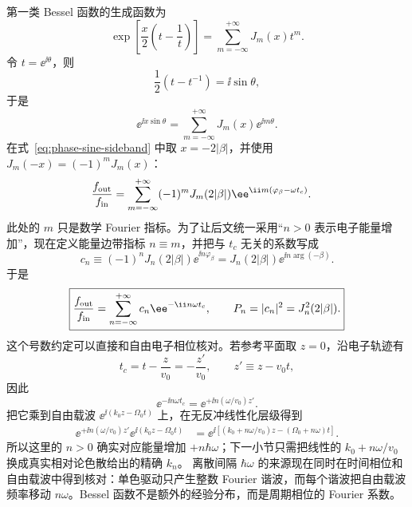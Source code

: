 第一类 Bessel 函数的生成函数为
\begin{equation}
\exp\!\left[\frac{x}{2}\left(t-\frac1t\right)\right]
=\sum_{m=-\infty}^{+\infty}J_m(x)t^m.
\label{eq:bessel-generating-function}
\end{equation}
令 $t=\ee^{\ii\theta}$，则
\begin{equation}
\frac12\left(t-t^{-1}\right)
=\ii\sin\theta,
\end{equation}
于是
\begin{equation}
\boxed{
\ee^{\ii x\sin\theta}
=\sum_{m=-\infty}^{+\infty}J_m(x)\ee^{\ii m\theta}.}
\label{eq:JA}
\end{equation}
在式~\eqref{eq:phase-sine-sideband} 中取 $x=-2|\beta|$，并使用
$J_m(-x)=(-1)^mJ_m(x)$：
\begin{align}
\frac{f_{\rm out}}{f_{\rm in}}
&=\sum_{m=-\infty}^{+\infty}
(-1)^mJ_m(2|\beta|)
\ee^{\ii m(\varphi_\beta-\omega t_c)}.
\label{eq:phase-fourier-raw-index}
\end{align}
此处的 $m$ 只是数学 Fourier 指标。为了让后文统一采用“$n>0$ 表示电子能量增加”，现在定义能量边带指标 $n\equiv m$，并把与 $t_c$ 无关的系数写成
\begin{equation}
\boxed{
 c_n
 \equiv (-1)^nJ_n(2|\beta|)\ee^{\ii n\varphi_\beta}
 =J_n(2|\beta|)\ee^{\ii n\arg(-\beta)}.}
\label{eq:sideband-amplitude-gain-convention}
\end{equation}
于是
\begin{equation}
\boxed{
\frac{f_{\rm out}}{f_{\rm in}}
=\sum_{n=-\infty}^{+\infty}c_n\ee^{-\ii n\omega t_c},
\qquad
P_n=|c_n|^2=J_n^2(2|\beta|).}
\label{eq:Pn-beta-standard}
\end{equation}
这个号数约定可以直接和自由电子相位核对。若参考平面取 $z=0$，沿电子轨迹有
\begin{equation}
 t_c=t-\frac{z}{v_0}=-\frac{z'}{v_0},
 \qquad z'\equiv z-v_0t,
\end{equation}
因此
\begin{equation}
 \ee^{-\ii n\omega t_c}
 =\ee^{+\ii n(\omega/v_0)z'}.
\label{eq:tc-to-comoving-sideband-phase}
\end{equation}
把它乘到自由载波
$\ee^{\ii(k_0z-\Omega_0t)}$ 上，在无反冲线性化层级得到
\begin{align}
\ee^{+\ii n(\omega/v_0)z'}
\ee^{\ii(k_0z-\Omega_0t)}
&=\ee^{\ii[(k_0+n\omega/v_0)z-(\Omega_0+n\omega)t]}.
\label{eq:gain-index-carrier-check}
\end{align}
所以这里的 $n>0$ 确实对应能量增加 $+n\hbar\omega$；下一小节只需把线性的
$k_0+n\omega/v_0$ 换成真实相对论色散给出的精确 $k_n$。
离散间隔 $\hbar\omega$ 的来源现在同时在时间相位和自由载波中得到核对：单色驱动只产生整数 Fourier 谐波，而每个谐波把自由载波频率移动 $n\omega$。Bessel 函数不是额外的经验分布，而是周期相位的 Fourier 系数。

